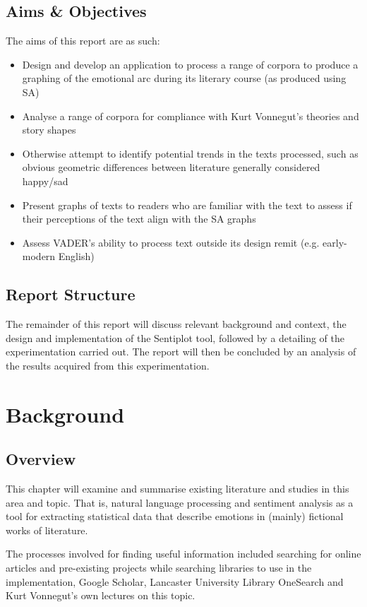\documentclass{article}
\begin{document}
    \subsection{Aims \& Objectives}
        The aims of this report are as such:
        \begin{itemize}
            \item Design and develop an application to process a range of corpora to produce a graphing of the emotional arc during its literary course (as produced using SA)
            \item Analyse a range of corpora for compliance with Kurt Vonnegut’s theories and story shapes
            \item Otherwise attempt to identify potential trends in the texts processed, such as obvious geometric differences between literature generally considered happy/sad
            \item Present graphs of texts to readers who are familiar with the text to assess if their perceptions of the text align with the SA graphs
            \item Assess VADER's ability to process text outside its design remit (e.g. early-modern English)
        \end{itemize}
    \subsection{Report Structure}
        The remainder of this report will discuss relevant background and context, the design and implementation of the Sentiplot tool, followed by a detailing of the experimentation carried out. The report will then be concluded by an analysis of the results acquired from this experimentation. \citep{reagan2016emotional}
\newpage
\section{Background}
\label{sec:background)}
    \subsection{Overview}
        This chapter will examine and summarise existing literature and studies in this area and topic. That is, natural language processing and sentiment analysis as a tool for extracting statistical data that describe emotions in (mainly) fictional works of literature.

        The processes involved for finding useful information included searching for online articles and pre-existing projects while searching libraries to use in the implementation, Google Scholar, Lancaster University Library OneSearch and Kurt Vonnegut’s own lectures on this topic.
\end{document}
